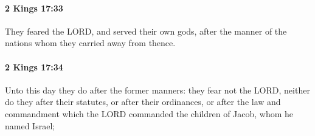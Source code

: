 		\paragraph{2 Kings 17:33} %
			\label{2KINGS-17-33}

			They feared the LORD, and served their own gods, after the manner of the nations whom they carried away from thence.


		\paragraph{2 Kings 17:34} %
			\label{2KINGS-17-34}

			Unto this day they do after the former manners: they fear not the LORD, neither do they after their statutes, or after their ordinances, or after the law and commandment which the LORD commanded the children of Jacob, whom he named Israel;


